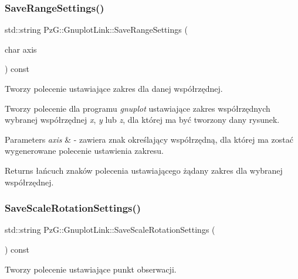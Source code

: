 \subsubsection{\texorpdfstring{Save\+Range\+Settings()}{SaveRangeSettings()}}
{\footnotesize\ttfamily std\+::string Pz\+G\+::\+Gnuplot\+Link\+::\+Save\+Range\+Settings (\begin{DoxyParamCaption}\item[{char}]{axis }\end{DoxyParamCaption}) const\hspace{0.3cm}{\ttfamily [protected]}}



Tworzy polecenie ustawiające zakres dla danej współrzędnej. 

Tworzy polecenie dla programu {\itshape gnuplot} ustawiające zakres współrzędnych wybranej współrzędnej {\itshape x}, {\itshape y} lub {\itshape z}, dla której ma być tworzony dany rysunek. 
\begin{DoxyParams}{Parameters}
{\em axis} & -\/ zawiera znak określający współrzędną, dla której ma zostać wygenerowane polecenie ustawienia zakresu. \\
\hline
\end{DoxyParams}
\begin{DoxyReturn}{Returns}
łańcuch znaków polecenia ustawiającego żądany zakres dla wybranej współrzędnej. 
\end{DoxyReturn}
\mbox{\label{class_pz_g_1_1_gnuplot_link_a8dccd32a85d0be08c6bd98b62281c743}} 
\subsubsection{\texorpdfstring{Save\+Scale\+Rotation\+Settings()}{SaveScaleRotationSettings()}}
{\footnotesize\ttfamily std\+::string Pz\+G\+::\+Gnuplot\+Link\+::\+Save\+Scale\+Rotation\+Settings (\begin{DoxyParamCaption}{ }\end{DoxyParamCaption}) const\hspace{0.3cm}{\ttfamily [protected]}}



Tworzy polecenie ustawiające punkt obserwacji. 

